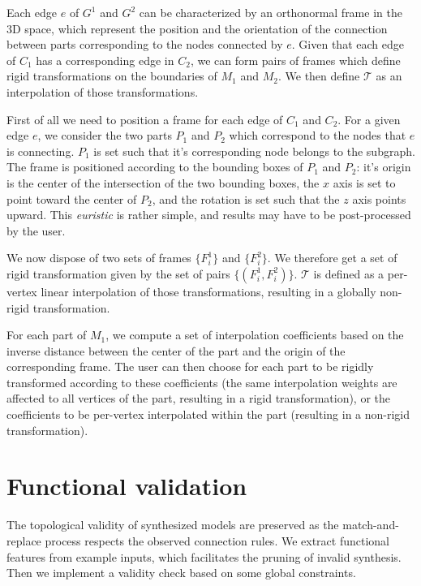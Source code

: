Each edge $e$ of $G^1$ and $G^2$ can be characterized by an orthonormal frame in the 3D space, which represent the position and the orientation of the connection between parts corresponding to the nodes connected by $e$. Given that each edge of $C_1$ has a corresponding edge in $C_2$, we can form pairs of frames which define rigid transformations on the boundaries of $M_1$ and $M_2$. We then define $\mathcal{T}$ as an interpolation of those transformations.

 First of all we need to position a frame for each edge of $C_1$ and $C_2$. For a given edge $e$, we consider the two parts $P_1$ and $P_2$ which correspond to the nodes that $e$ is connecting. $P_1$ is set such that it's corresponding node belongs to the subgraph. The frame is positioned according to the bounding boxes of $P_1$ and $P_2$: it's origin is the center of the intersection of the two bounding boxes, the $x$ axis is set to point toward the center of $P_2$, and the rotation is set such that the $z$ axis points upward. This \emph{euristic} is rather simple, and results may have to be post-processed by the user.

 We now dispose of two sets of frames $\{F_i^1\}$ and $\{F_i^2\}$. We therefore get a set of rigid transformation given by the set of pairs $\{(F_i^1, F_i^2)\}$. $\mathcal{T}$ is defined as a per-vertex linear interpolation of those transformations, resulting in a globally non-rigid transformation.

For each part of $M_1$, we compute a set of interpolation coefficients based on the inverse distance between the center of the part and the origin of the corresponding frame. The user can then choose for each part to be rigidly transformed according to these coefficients (the same interpolation weights are affected to all vertices of the part, resulting in a rigid transformation), or the coefficients to be per-vertex interpolated within the part (resulting in a non-rigid transformation).

\section{Functional validation}

The topological validity of synthesized models are preserved as the match-and-replace process respects the observed connection rules. We extract functional features from example inputs, which facilitates the pruning of invalid synthesis. Then we implement a validity check based on some global constraints.

